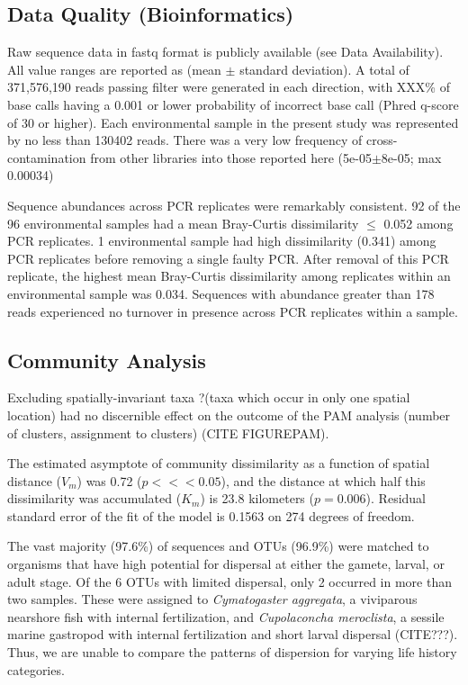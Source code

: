 \documentclass[11pt,letterpaper]{article} %
\begin{document}
\subsection*{Data Quality (Bioinformatics)}
Raw sequence data in fastq format is publicly available (see Data Availability).
All value ranges are reported as (mean $\pm$ standard deviation).
A total of 371,576,190 reads passing filter were generated in each direction, with XXX\% of base calls having a 0.001 or lower probability of incorrect base call (Phred q-score of 30 or higher).
Each environmental sample in the present study was represented by no less than 130402 reads.
There was a very low frequency of cross-contamination from other libraries into those reported here (5e-05$\pm$8e-05; max 0.00034)

Sequence abundances across PCR replicates were remarkably consistent.
92 of the 96 environmental samples had a mean Bray-Curtis dissimilarity $\leq$ 0.052 among PCR replicates.
1 environmental sample had high dissimilarity (0.341) among PCR replicates before removing a single faulty PCR.
After removal of this PCR replicate, the highest mean Bray-Curtis dissimilarity among replicates within an environmental sample was 0.034.
Sequences with abundance greater than 178 reads experienced no turnover in presence across PCR replicates within a sample.

\subsection*{Community Analysis}
Excluding spatially-invariant taxa ?(taxa which occur in only one spatial location) had no discernible effect on the outcome of the PAM analysis (number of clusters, assignment to clusters) (CITE FIGUREPAM).

The estimated asymptote of community dissimilarity as a function of spatial distance ($V_m$) was 0.72 ($p <<< 0.05$), and the distance at which half this dissimilarity was accumulated ($K_m$) is 23.8 kilometers ($p = 0.006$).
Residual standard error of the fit of the model is 0.1563 on 274 degrees of freedom.

The vast majority (97.6\%) of sequences and OTUs (96.9\%) were matched to organisms that have high potential for dispersal at either the gamete, larval, or adult stage.
Of the 6 OTUs with limited dispersal, only 2 occurred in more than two samples.
These were assigned to \textit{Cymatogaster aggregata}, a viviparous nearshore fish with internal fertilization, and \textit{Cupolaconcha meroclista}, a sessile marine gastropod with internal fertilization and short larval dispersal (CITE???).
Thus, we are unable to compare the patterns of dispersion for varying life history categories.
\end{document}
